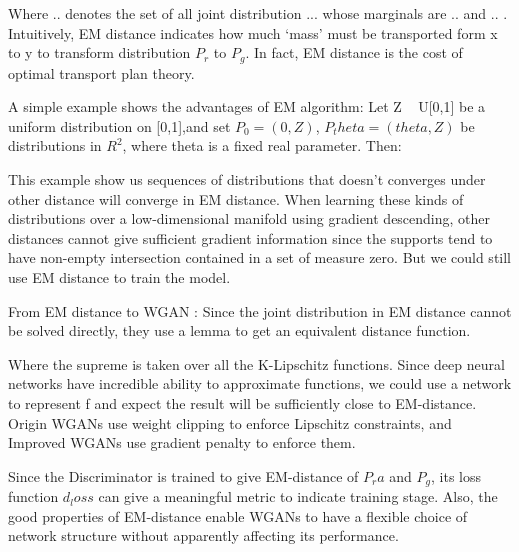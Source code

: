 Where .. denotes the set of all joint distribution ... whose marginals are .. and .. . Intuitively, EM distance indicates how much ‘mass’ must be transported form x to y to transform distribution $P_r$ to $P_g$. In fact, EM distance is the cost of optimal transport plan theory.

A simple example shows the advantages of EM algorithm: Let Z ~ U[0,1] be a uniform distribution on [0,1],and set $P_0 = (0,Z)$, $P_theta=(theta,Z)$ be distributions in $R^2$, where theta is a fixed real parameter. Then:

This example show us sequences of distributions that doesn’t converges under other distance will converge in EM distance. When learning these kinds of distributions over a low-dimensional manifold using gradient descending, other distances cannot give sufficient gradient information since the supports tend to have non-empty intersection contained in a set of measure zero. But we could still use EM distance to train the model.

From EM distance to WGAN	: Since the joint distribution in EM distance cannot be solved directly, they use a lemma to get an equivalent distance function.

Where the supreme is taken over all the K-Lipschitz functions. Since deep neural networks have incredible ability to approximate functions, we could use a network to represent f and expect the result will be sufficiently close to EM-distance. Origin WGANs use weight clipping to enforce Lipschitz constraints, and Improved WGANs use gradient penalty to enforce them.

Since the Discriminator is trained to give EM-distance of $P_ra$ and $P_g$, its loss function $d_loss$ can give a meaningful metric to indicate training stage. Also, the good properties of EM-distance enable WGANs to have a flexible choice of network structure without apparently affecting its performance.
